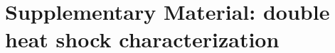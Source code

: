 \documentclass[oneside, 10pt, a4paper, twocolumn]{article}
\begin{document}




\clearpage

\section{Supplementary Material: double heat shock characterization}
\end{document}
